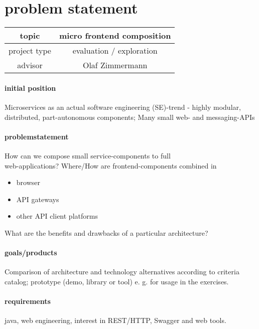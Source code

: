 
\section{problem statement}

\begin{tabular}{| c | c |}
    \hline
    topic & micro frontend composition \\\hline
    project type & evaluation / exploration \\\hline
    advisor & Olaf Zimmermann \\\hline
\end{tabular}

\paragraph{initial position} Microservices as an actual software engineering (SE)-trend - highly modular, distributed, part-autonomous components; Many small web- and messaging-APIs
\paragraph{problemstatement} 
How can we compose small service-components to full \\web-applications? Where/How are frontend-components combined in
\begin{itemize}
    \item browser
    \item API gateways
    \item other API client platforms
\end{itemize}

What are the benefits and drawbacks of a particular architecture?

\paragraph{goals/products} Comparison of architecture and technology alternatives according
to criteria catalog; prototype (demo, library or tool) e. g. for usage in the exercises.

\paragraph{requirements} java, web engineering, interest in REST/HTTP, Swagger and web tools.